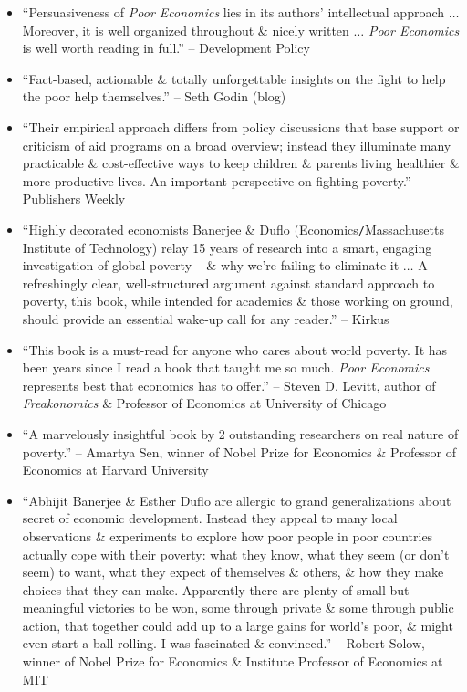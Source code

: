 \documentclass{article}
\begin{document}
\begin{enumerate}
\begin{itemize}
		\item ``Persuasiveness of {\it Poor Economics} lies in its authors' intellectual approach $\ldots$ Moreover, it is well organized throughout \& nicely written $\ldots$ {\it Poor Economics} is well worth reading in full.'' -- Development Policy
		\item ``Fact-based, actionable \& totally unforgettable insights on the fight to help the poor help themselves.'' -- {\sc Seth Godin} (blog)
		\item ``Their empirical approach differs from policy discussions that base support or criticism of aid programs on a broad overview; instead they illuminate many practicable \& cost-effective ways to keep children \& parents living healthier \& more productive lives. An important perspective on fighting poverty.'' -- Publishers Weekly
		\item ``Highly decorated economists {\sc Banerjee \& Duflo} (Economics{\tt/}Massachusetts Institute of Technology) relay 15 years of research into a smart, engaging investigation of global poverty -- \& why we're failing to eliminate it $\ldots$ A refreshingly clear, well-structured argument against standard approach to poverty, this book, while intended for academics \& those working on ground, should provide an essential wake-up call for any reader.'' -- Kirkus
		\item ``This book is a must-read for anyone who cares about world poverty. It has been years since I read a book that taught me so much. {\it Poor Economics} represents best that economics has to offer.'' -- {\sc Steven D. Levitt}, author of {\it Freakonomics} \& Professor of Economics at University of Chicago
		\item ``A marvelously insightful book by 2 outstanding researchers on real nature of poverty.'' -- {\sc Amartya Sen}, winner of Nobel Prize for Economics \& Professor of Economics at Harvard University
		\item ``{\sc Abhijit Banerjee \& Esther Duflo} are allergic to grand generalizations about secret of economic development. Instead they appeal to many local observations \& experiments to explore how poor people in poor countries actually cope with their poverty: what they know, what they seem (or don't seem) to want, what they expect of themselves \& others, \& how they make choices that they can make. Apparently there are plenty of small but meaningful victories to be won, some through private \& some through public action, that together could add up to a large gains for world's poor, \& might even start a ball rolling. I was fascinated \& convinced.'' -- {\sc Robert Solow}, winner of Nobel Prize for Economics \& Institute Professor of Economics at MIT

\end{itemize}
\end{enumerate}
\end{document}
